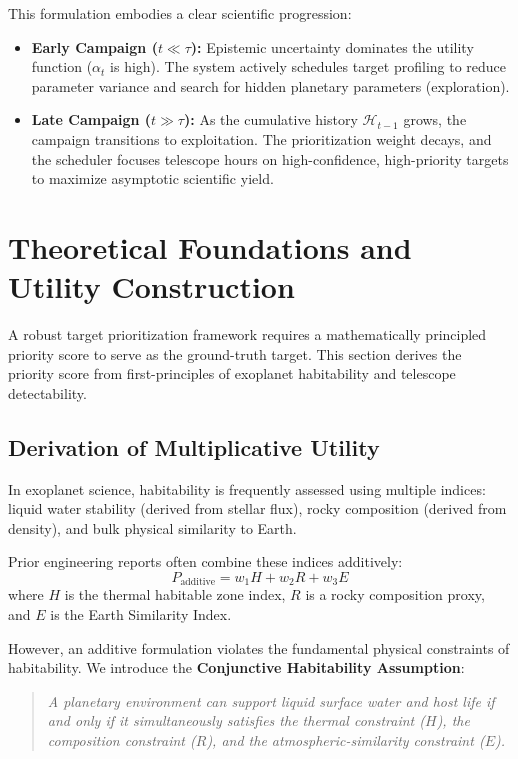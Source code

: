 \documentclass[11pt,a4paper]{article}
\begin{document}
This formulation embodies a clear scientific progression:
\begin{itemize}
    \item \textbf{Early Campaign ($t \ll \tau$):} Epistemic uncertainty dominates the utility function ($\alpha_t$ is high). The system actively schedules target profiling to reduce parameter variance and search for hidden planetary parameters (exploration).
    \item \textbf{Late Campaign ($t \gg \tau$):} As the cumulative history $\mathcal{H}_{t-1}$ grows, the campaign transitions to exploitation. The prioritization weight decays, and the scheduler focuses telescope hours on high-confidence, high-priority targets to maximize asymptotic scientific yield.
\end{itemize}

\section{Theoretical Foundations and Utility Construction}
\label{sec:theory}

A robust target prioritization framework requires a mathematically principled priority score to serve as the ground-truth target. This section derives the priority score from first-principles of exoplanet habitability and telescope detectability.

\subsection{Derivation of Multiplicative Utility}

In exoplanet science, habitability is frequently assessed using multiple indices: liquid water stability (derived from stellar flux), rocky composition (derived from density), and bulk physical similarity to Earth.

Prior engineering reports often combine these indices additively:
\begin{equation}
P_{\text{additive}} = w_1 H + w_2 R + w_3 E
\label{eq:additive_heur}
\end{equation}
where $H$ is the thermal habitable zone index, $R$ is a rocky composition proxy, and $E$ is the Earth Similarity Index.

However, an additive formulation violates the fundamental physical constraints of habitability. We introduce the \textbf{Conjunctive Habitability Assumption}:
\begin{quote}
\textit{A planetary environment can support liquid surface water and host life if and only if it simultaneously satisfies the thermal constraint ($H$), the composition constraint ($R$), and the atmospheric-similarity constraint ($E$).}
\end{quote}
\end{document}
